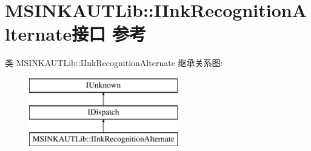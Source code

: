 \hypertarget{interface_m_s_i_n_k_a_u_t_lib_1_1_i_ink_recognition_alternate}{}\section{M\+S\+I\+N\+K\+A\+U\+T\+Lib\+:\+:I\+Ink\+Recognition\+Alternate接口 参考}
\label{interface_m_s_i_n_k_a_u_t_lib_1_1_i_ink_recognition_alternate}
类 M\+S\+I\+N\+K\+A\+U\+T\+Lib\+:\+:I\+Ink\+Recognition\+Alternate 继承关系图\+:\begin{figure}[H]
\begin{center}
\leavevmode
\includegraphics[height=3.000000cm]{interface_m_s_i_n_k_a_u_t_lib_1_1_i_ink_recognition_alternate}
\end{center}
\end{figure}
